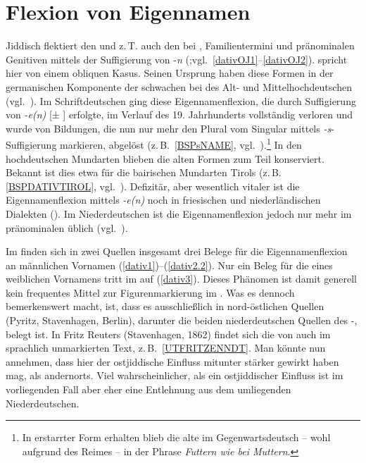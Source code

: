 
 \section{Flexion von Eigennamen}\label{dativnamen}
 Jiddisch flektiert den  und z.\,T. auch den  bei , Familientermini und pränominalen Genitiven mittels der Suffigierung von -\textit{n} (\citealt[161f]{Jacobs2005};vgl.\, \ref{dativOJ1}–\ref{dativOJ2}). \cite[161]{Jacobs2005} spricht hier von einem obliquen Kasus. Seinen Ursprung haben diese Formen in der germanischen Komponente der schwachen  bei  des Alt- und Mittelhochdeutschen (vgl.\, \citealt[insbes. 230f]{Nuebling2012}). Im Schriftdeutschen ging diese Eigennamenflexion, die durch Suffigierung von \textit{-e(n)} [± ] erfolgte, im Verlauf des 19. Jahrhunderts vollständig verloren und wurde von Bildungen, die nun nur mehr den Plural vom Singular mittels \textit{-s}-Suffigierung markieren, abgelöst (z.\,B.\, \ref{BSPsNAME}, vgl.\, \citealt[240]{Nuebling2012}).\footnote{In erstarrter Form erhalten blieb die alte  im Gegenwartsdeutsch – wohl aufgrund des Reimes – in der Phrase \textit{Futtern wie bei Muttern}.} In den hochdeutschen Mundarten blieben die alten Formen zum Teil konserviert. Bekannt ist dies etwa für die bairischen Mundarten Tirols (z.\,B.\, \ref{BSPDATIVTIROL}, vgl.\, \citealt[50]{Schatz1903}). Defizitär, aber wesentlich vitaler ist die Eigennamenflexion mittels \textit{-e(n)} noch in friesischen und niederländischen Dialekten (\citealt{Hoekstra2010}). Im Niederdeutschen ist die Eigennamenflexion jedoch nur mehr im pränominalen  üblich (vgl.\, \citealt[144]{Lindowetal1998}). 

 Im  finden sich in zwei Quellen insgesamt drei Belege für die Eigennamenflexion an männlichen Vornamen (\ref{dativ1})--(\ref{dativ2.2}). Nur ein Beleg für die  eines weiblichen Vornamens tritt im  auf (\ref{dativ3}). Dieses Phänomen ist damit generell kein frequentes Mittel zur Figurenmarkierung im \hai{{\LiJi}}. Was es dennoch bemerkenswert macht, ist, dass es ausschließlich in nord-östlichen Quellen (Pyritz, Stavenhagen, Berlin), darunter die beiden niederdeutschen Quellen des -, belegt ist. In Fritz Reuters  (Stavenhagen, 1862) findet sich die  von  auch im sprachlich unmarkierten Text, z.\,B.\, \ref{UTFRITZENNDT}. Man könnte nun annehmen, dass hier der ostjiddische Einfluss mitunter stärker gewirkt haben mag, als andernorts. Viel wahrscheinlicher, als ein ostjiddischer Einfluss ist im vorliegenden Fall aber eher eine Entlehnung aus dem umliegenden Niederdeutschen.
 


